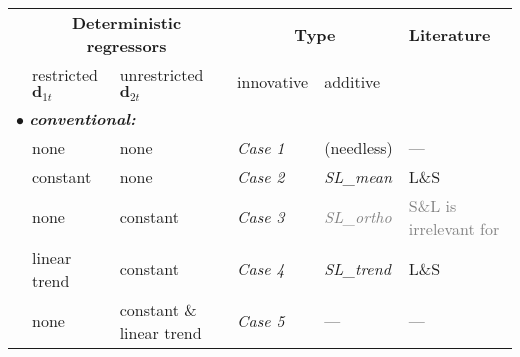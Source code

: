 

\begin{threeparttable}
	\begin{tabular}{lll|l||ll}
		\hline\hline
		& \multicolumn{2}{c|}{ \textbf{Deterministic regressors} } & \multicolumn{2}{|c}{ \textbf{Type} } & \textbf{Literature} \\[4pt]
		& restricted $ \boldsymbol{d}_{1t} $ & unrestricted $ \boldsymbol{d}_{2t} $ & innovative\tnote{a)} \quad & additive\tnote{b)} &  \\ \hline
		\multicolumn{3}{l|}{$ \bullet $ \textit{\textbf{conventional:}}} & & & \\
		& none               & none                          & \textit{Case 1} & (needless) & --- \\
		& constant           & none                          & \textit{Case 2} & \textit{SL\_mean} & L\&S \citeyearpar[p.~185]{SaikkonenLutkepohl2000a} \\
		& none               & constant                      & \textit{Case 3} & \textcolor{gray}{\textit{SL\_ortho}} & \textcolor{gray}{S\&L \citeyearpar{SaikkonenLutkepohl2000} is irrelevant for \pkg{pvars}} \\
		& linear trend       & constant                      & \textit{Case 4} & \textit{SL\_trend} & L\&S \citeyearpar{SaikkonenLutkepohl2000a} \\
		& none               & constant \& linear trend      & \textit{Case 5} & --- & --- \\ \hline
		

\end{tabular}
\end{threeparttable}
